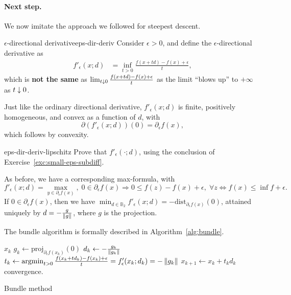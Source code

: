\paragraph{Next step.} We now imitate the approach we followed for steepest
descent.

\begin{cdefinition}{$\epsilon$-directional derivative}{eps-dir-deriv}
	Consider $\epsilon > 0$, and define the $\epsilon$-directional derivative
	as
	\begin{align*}
		f'_{\epsilon}(x; d) &= \inf_{t > 0} \frac{f(x + td) - f(x) +
		\epsilon}{t},
	\end{align*}
	which is \textbf{not the same} as $\lim_{t \downarrow 0} \frac{f(x+td) - f(x) +
	\epsilon}{t}$ as the limit ``blows up'' to $+\infty$ as $t \downarrow 0$.
\end{cdefinition}

Just like the ordinary directional derivative, $f'_{\epsilon}(x; d)$ is finite,
positively homogeneous, and convex as a function of $d$, with
\[
	\partial \left( f'_{\epsilon}(x; d) \right)(0) = \partial_{\epsilon} f(x),
\]
which follows by convexity.

\begin{exercise}{}{eps-dir-deriv-lipschitz}
	Prove that $f'_{\epsilon}(\cdot; d)$, using the conclusion of
	Exercise~\ref{exc:small-eps-subdiff}.
\end{exercise}

As before, we have a corresponding max-formula, with
\[
	f'_{\epsilon}(x; d) = \max_{y \in \partial_{\epsilon} f(x)}, \;
	0 \in \partial_{\epsilon} f(x) \Rightarrow
	0 \leq f(z) - f(x) + \epsilon, \; \forall z \Leftrightarrow
	f(x) \leq \inf f + \epsilon.
\]
If $0 \in \partial_{\epsilon} f(x)$, then we have $\min_{d \in \mathbb{B}_2}
f'_{\epsilon}(x; d) = -\mathrm{dist}_{\partial_{\epsilon} f(x)}(0)$, attained
uniquely by $d = -\frac{g}{\left \| g \right \|}$, where $g$ is the projection.

The bundle algorithm is formally described in Algorithm~\ref{alg:bundle}.
\begin{algorithm}[h!]
	\centering
	\begin{algorithmic}
			\State \Return $x_k$ 
		\Else
			\State $g_k \gets \mathrm{proj}_{\partial_{\epsilon} f(x_k)}(0)$
			\State $d_k \gets - \frac{g_k}{\left \| g_k \right \|}$
			\State $
				t_k \gets \operatorname*{argmin}_{t > 0} \frac{f(x_k + td_k) - f(x_k) + \epsilon}{t}
				= f'_{\epsilon}(x_k; d_k) = - \left \| g_k \right \| $
		\State $x_{k+1} \gets x_k + t_k d_k$
		\EndIf
		\Until convergence.
	\end{algorithmic}
	\caption{Bundle method}
	\label{alg:bundle}
\end{algorithm}

